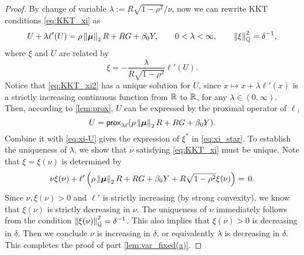 \begin{proof}
    By change of variable $\lambda := R \sqrt{1 - \rho^2}/\nu$, now we can rewrite KKT conditions \cref{eq:KKT_xi} as
    \begin{equation}\label{eq:KKT_xi2}
            U + \lambda \ell' ( U ) = \rho\left\|{{\boldsymbol{\mu}}}\right\|_2 R + RG + \beta_0 Y,
            \qquad
            0 < \lambda < \infty,
            \qquad
            \left\|{\xi}\right\|_{\mathbb{Q}}^2 = \delta^{-1},
    \end{equation}
    where $\xi$ and $U$ are related by
    \begin{equation}\label{eq:xi-U}
        \xi = -\frac{\lambda}{R\sqrt{1 - \rho^2}} \ell'(U).
    \end{equation}
    Notice that \cref{eq:KKT_xi2} has a unique solution for $U$, since $x \mapsto x + \lambda \ell'(x)$ is a strictly increasing continuous function from $\mathbb{R}$ to $\mathbb{R}$, for any $\lambda \in (0, \infty)$. Then, according to \cref{lem:prox}, $U$ can be expressed by the proximal operator of $\ell$,
    \begin{equation}
    \label{eq:U_prox}
        U = \mathsf{prox}_{ \lambda \ell}( \rho\left\|{{\boldsymbol{\mu}}}\right\|_2 R + RG + \beta_0 Y ).
    \end{equation}
    Combine it with \cref{eq:xi-U} gives the expression of $\xi^*$ in \cref{eq:xi_star}. To establish the uniqueness of $\lambda$, we show that $\nu$ satisfying \cref{eq:KKT_xi} must be unique. Note that $\xi = \xi (\nu)$ is determined by
    \begin{equation*}
        \nu \xi(\nu) + \ell' \left( \rho\left\|{{\boldsymbol{\mu}}}\right\|_2 R + RG + \beta_0 Y + R\sqrt{1 - \rho^2} \xi (\nu) \right) = \, 0.
    \end{equation*}
    Since $\nu, \xi(\nu) > 0$ and $\ell'$ is strictly increasing (by strong convexity), we know that $\xi(\nu)$ is strictly decreasing in $\nu$. The uniqueness of $\nu$ immediately follows from the condition $\left\|{\xi(\nu)}\right\|_{\mathbb{Q}}^2 = \delta^{-1}$. This also implies that $\xi(\nu) > 0$ is decreasing in $\delta$. Then we conclude $\nu$ is increasing in $\delta$, or equivalently $\lambda$ is decreasing in $\delta$. This completes the proof of part \ref{lem:var_fixed(a)}.



\end{proof}
